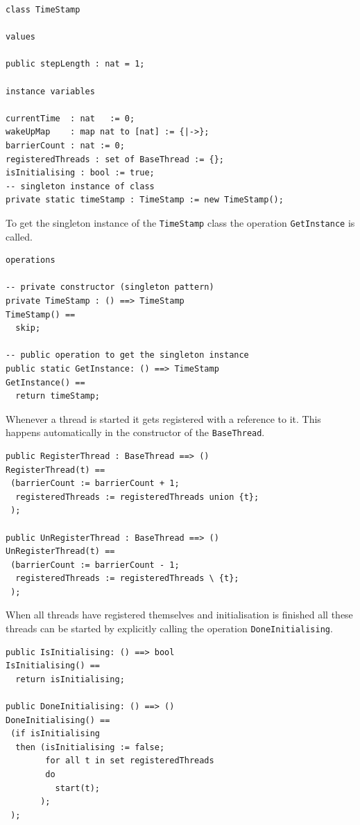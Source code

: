 \documentclass{overturerepchap}
\begin{document}
\begin{lstlisting}
class TimeStamp

values

public stepLength : nat = 1;

instance variables

currentTime  : nat   := 0;
wakeUpMap    : map nat to [nat] := {|->};
barrierCount : nat := 0;
registeredThreads : set of BaseThread := {};
isInitialising : bool := true;
-- singleton instance of class
private static timeStamp : TimeStamp := new TimeStamp();
\end{lstlisting}

To get the singleton instance of the \texttt{TimeStamp} class the operation \texttt{GetInstance} is called.

\begin{lstlisting}
operations

-- private constructor (singleton pattern)
private TimeStamp : () ==> TimeStamp
TimeStamp() ==
  skip;

-- public operation to get the singleton instance
public static GetInstance: () ==> TimeStamp
GetInstance() ==
  return timeStamp;
\end{lstlisting}

Whenever a thread is started it gets registered with a reference to it. This happens automatically in the constructor of the \texttt{BaseThread}.

\begin{lstlisting}
public RegisterThread : BaseThread ==> ()
RegisterThread(t) ==
 (barrierCount := barrierCount + 1;
  registeredThreads := registeredThreads union {t};  
 );
 
public UnRegisterThread : BaseThread ==> ()
UnRegisterThread(t) ==
 (barrierCount := barrierCount - 1;
  registeredThreads := registeredThreads \ {t};
 );
\end{lstlisting}

When all threads have registered themselves and initialisation is finished
all these threads can be started by explicitly calling the operation \texttt{DoneInitialising}.

\begin{lstlisting}
public IsInitialising: () ==> bool
IsInitialising() ==
  return isInitialising;
 
public DoneInitialising: () ==> ()
DoneInitialising() ==
 (if isInitialising
  then (isInitialising := false;
        for all t in set registeredThreads 
        do
          start(t);
       );
 );
\end{lstlisting}
\end{document}
